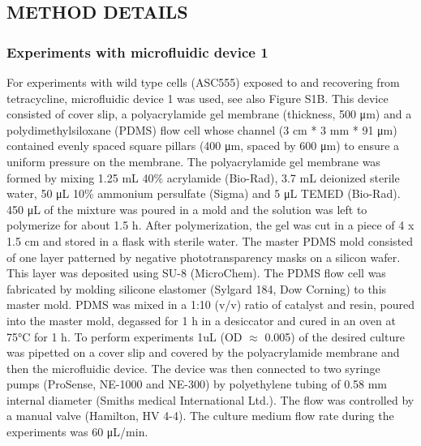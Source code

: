 \subsection{METHOD DETAILS}

\subsubsection{Experiments with microfluidic device 1}
For experiments with wild type cells (ASC555) exposed to and recovering from tetracycline, microfluidic device 1 was used, see also Figure S1B. This device \cite{Boulineau2013} consisted of cover slip, a polyacrylamide gel membrane (thickness, 500 μm) and a polydimethylsiloxane (PDMS) flow cell whose channel (3 cm * 3 mm * 91 μm) contained evenly spaced square pillars (400 μm, spaced by 600 μm) to ensure a uniform pressure on the membrane. 
The polyacrylamide gel membrane was formed by mixing 1.25 mL 40\% acrylamide (Bio-Rad), 3.7 mL deionized sterile water, 50 μL 10\% ammonium persulfate (Sigma) and 5 μL TEMED (Bio-Rad). 450 μL of the mixture was poured in a mold and the solution was left to polymerize for about 1.5 h. 
After polymerization, the gel was cut in a piece of 4 x 1.5 cm and stored in a flask with sterile water. The master PDMS mold consisted of one layer patterned by negative phototransparency masks on a silicon wafer. This layer was deposited using SU-8 (MicroChem). 
The PDMS flow cell was fabricated by molding silicone elastomer (Sylgard 184, Dow Corning) to this master mold. PDMS was mixed in a 1:10 (v/v) ratio of catalyst and resin, poured into the master mold, degassed for 1 h in a desiccator and cured in an oven at 75°C for 1 h. 
To perform experiments 1uL (OD $\approx$ 0.005) of the desired culture was pipetted on a cover slip and covered by the polyacrylamide membrane and then the microfluidic device. The device was then connected to two syringe pumps (ProSense, NE-1000 and NE-300) by polyethylene tubing of 0.58 mm internal diameter (Smiths medical International Ltd.). The flow was controlled by a manual valve (Hamilton, HV 4-4). 
The culture medium flow rate during the experiments was 60 μL/min.


